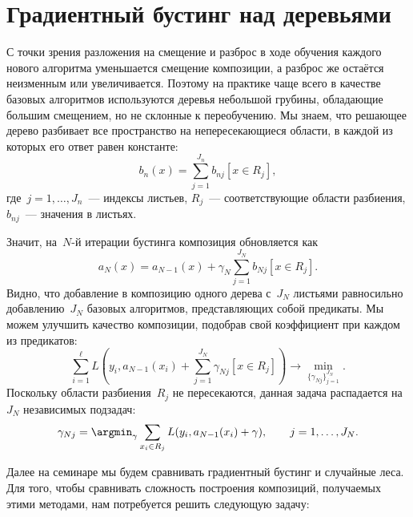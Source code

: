 \documentclass[12pt,fleqn]{article}
\begin{document}
\section{Градиентный бустинг над деревьями}

С точки зрения разложения на смещение и разброс в ходе обучения каждого нового алгоритма уменьшается смещение композиции, а разброс же остаётся неизменным или увеличивается. Поэтому на практике чаще всего в качестве базовых алгоритмов используются деревья небольшой грубины, обладающие большим смещением, но не склонные к переобучению. Мы знаем, что решающее дерево разбивает все пространство на непересекающиеся области, в каждой из которых его ответ равен константе:
\[
    b_n(x)
    =
    \sum_{j = 1}^{J_n}
        b_{nj}
        [x \in R_j],
\]
где~$j = 1, \dots, J_n$~--- индексы листьев,
$R_j$~--- соответствующие области разбиения,
$b_{nj}$~--- значения в листьях.

Значит, на~$N$-й итерации бустинга композиция обновляется как
\[
    a_N(x)
    =
    a_{N - 1}(x)
    +
    \gamma_N
    \sum_{j = 1}^{J_N}
        b_{Nj}
        [x \in R_j].
\]
Видно, что добавление в композицию одного дерева с~$J_N$ листьями равносильно
добавлению~$J_N$ базовых алгоритмов, представляющих собой предикаты.
Мы можем улучшить качество композиции, подобрав свой коэффициент
при каждом из предикатов:
\[
    \sum_{i = 1}^{\ell}
        L\left(
            y_i,
            a_{N - 1}(x_i)
            +
            \sum_{j = 1}^{J_N}
                \gamma_{Nj}
                [x \in R_j]
        \right)
    \to
    \min_{\{\gamma_{Nj}\}_{j = 1}^{J_N}}.
\]
Поскольку области разбиения~$R_j$ не пересекаются,
данная задача распадается на~$J_N$ независимых подзадач:
\[
    \gamma_{Nj}
    =
    \argmin_\gamma
        \sum_{x_i \in R_j}
            L(y_i, a_{N - 1}(x_i) + \gamma),
    \qquad
    j = 1, \dots, J_N.
\]

Далее на семинаре мы будем сравнивать градиентный бустинг и случайные леса. Для того, чтобы сравнивать сложность построения композиций, получаемых этими методами, нам потребуется решить следующую задачу:
\end{document}
